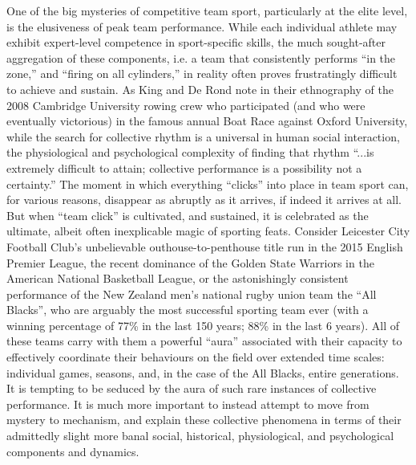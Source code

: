 One of the big mysteries of competitive team sport, particularly at the elite level, is the elusiveness of peak team performance.  While each individual athlete may exhibit expert-level competence in sport-specific skills, the much sought-after aggregation of these components, i.e. a team that consistently performs ``in the zone,'' and ``firing on all cylinders,'' in reality often proves frustratingly difficult to achieve and sustain.  As King and De Rond \textcite[568]{King2011} note in their ethnography of the 2008 Cambridge University rowing crew who participated (and who were eventually victorious) in the famous annual Boat Race against Oxford University, while the search for collective rhythm is a universal in human social interaction, the physiological and psychological complexity of finding that rhythm ``...is extremely difficult to attain; collective performance is a possibility not a certainty.''   The moment in which everything ``clicks'' into place in team sport can, for various reasons, disappear as abruptly as it arrives, if indeed it arrives at all.
But when ``team click'' is cultivated, and sustained, it is celebrated as the ultimate, albeit often inexplicable magic of sporting feats. Consider Leicester City Football Club's unbelievable outhouse-to-penthouse title run in the 2015 English Premier League, the recent dominance of the Golden State Warriors in the American National Basketball League, or the astonishingly consistent performance of the New Zealand men's national rugby union team the ``All Blacks'', who are arguably the most successful sporting team ever (with a winning percentage of 77\% in the last 150 years; 88\% in the last 6 years).  All of these teams carry with them a powerful ``aura'' associated with their capacity to effectively coordinate their behaviours on the field over extended time scales: individual games, seasons, and, in the case of the All Blacks, entire generations.  It is tempting to be seduced by the aura of such rare instances of collective performance.  It is much more important to instead attempt to move from mystery to mechanism, and explain these collective phenomena in terms of their admittedly slight more banal social, historical, physiological, and psychological components and dynamics.

